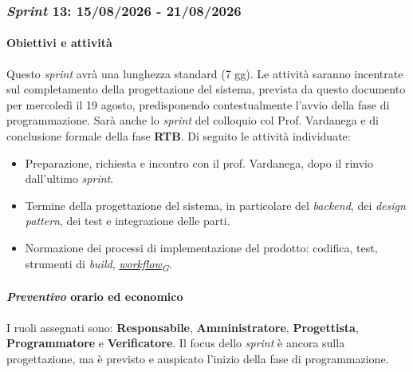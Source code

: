 \documentclass[12pt, a4paper]{article}
\newcommand{\urlglossario}{https://skynetunigroup.github.io/Code_Guardian/Documentazione/RTB/glossario_v1.0.0.pdf} %
\newcommand{\glo}[2]{\href{\urlglossario\#nameddest=#2}{#1\textsubscript{G}}}
\begin{document}
{\subsubsection{\textit{Sprint} 13: 15/08/2026 - 21/08/2026}

\paragraph{Obiettivi e attività}

Questo \textit{sprint} avrà una lunghezza standard (7 gg). Le attività saranno incentrate sul completamento della progettazione del sistema, prevista da questo documento per mercoledì il 19 agosto, predisponendo contestualmente l'avvio della fase di programmazione. Sarà anche lo \textit{sprint} del colloquio col Prof. Vardanega e di conclusione formale della fase \textbf{RTB}. Di seguito le attività individuate:

\begin{itemize}
    \item Preparazione, richiesta e incontro con il prof. Vardanega, dopo il rinvio dall'ultimo \textit{sprint}.
    \item Termine della progettazione del sistema, in particolare del \textit{backend}, dei \textit{design pattern}, dei test e integrazione delle parti.
    \item Normazione dei processi di implementazione del prodotto: codifica, test, strumenti di \textit{build}, \textit{\glo{workflow}{workflow}}.
\end{itemize}

\paragraph{\textit{Preventivo} orario ed economico}

I ruoli assegnati sono: \textbf{Responsabile}, \textbf{Amministratore}, \textbf{Progettista}, \textbf{Programmatore} e \textbf{Verificatore}. Il focus dello \textit{sprint} è ancora sulla progettazione, ma è previsto e auspicato l'inizio della fase di programmazione.

}
\end{document}
